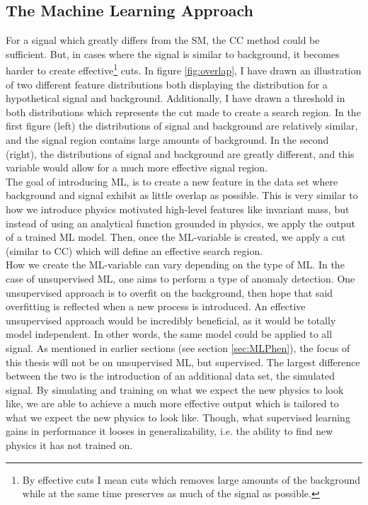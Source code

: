 \subsection{The Machine Learning Approach}
For a signal which greatly differs from the \ac{SM}, the \ac{CC} method could be sufficient. But, in 
cases where the signal is similar to background, it becomes harder to create effective\footnote{By effective
cuts I mean cuts which removes large amounts of the background while at the same time preserves as much of 
the signal as possible.} cuts. In figure \ref{fig:overlap}, I have drawn an illustration of two different feature distributions both 
displaying the distribution for a hypothetical signal and background. Additionally, I have drawn a 
threshold in both distributions which represents the cut made to create a search region. In the first 
figure (left) the distributions of signal and background are relatively similar, and the signal region 
contains large amounts of background. In the second (right), the distributions of signal and background 
are greatly different, and this variable would allow for a much more effective signal region. 
\\
The goal of introducing \ac{ML}, is to create a new feature in the data set where background and signal
exhibit as little overlap as possible. This is very similar to how we introduce physics motivated high-level
features like invariant mass, but instead of using an analytical function grounded in physics, 
we apply the output of a trained \ac{ML} model. Then, once the \ac{ML}-variable is created, 
we apply a cut (similar to \ac{CC}) which will define an effective search region. 
\\
How we create the \ac{ML}-variable can vary depending on the type of \ac{ML}. In the case of unsupervised 
\ac{ML}, one aims to perform a type of anomaly detection. One unsupervised approach is to overfit on the background,
then hope that said overfitting is reflected when a new process is introduced. An effective unsupervised approach
would be incredibly beneficial, as it would be totally model independent. In other words, the same model could be applied 
to all signal. As mentioned in earlier sections (see section \ref{sec:MLPhen}), the focus of this thesis will not be on 
unsupervised \ac{ML}, but supervised. The largest difference between the two is the introduction of an additional data set,
the simulated signal. By simulating and training on what we expect the new physics to look like, we are able to achieve a much more 
effective output which is tailored to what we expect the new physics to look like. Though, what supervised learning gains in performance
it looses in generalizability, i.e. the ability to find new physics it has not trained on.